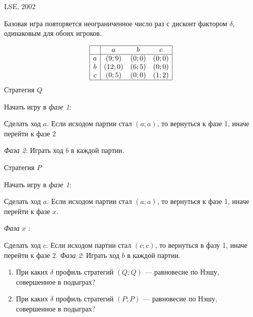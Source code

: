 \begin{problem}
\begin{source}
LSE, 2002
\end{source}
Базовая игра повторяется неограниченное число раз с дисконт фактором  $\delta $, одинаковым для обоих игроков.

\[\begin{array}{|c|ccc|}  \hline {} & {a} & {b} & {c} \\  \hline {a} & {\left(9;9\right)} & {\left(0;0\right)} & {\left(0;0\right)} \\ {b} & {\left(12;0\right)} & {\left(6;5\right)} & {\left(0;0\right)} \\ {c} & {\left(0;5\right)} & {\left(0;0\right)} & {\left(1;2\right)} \\  \hline  \end{array}\]
Стратегия  $Q$\par
Начать игру в {\it фазе 1}:\par
Сделать ход  $a$. Если исходом партии стал  $\left(a;a\right)$, то вернуться к фазе 1, иначе перейти к фазе 2\par
{\it Фаза 2}: Играть ход  $b$  в каждой партии.\par

Стратегия  $P$\par
Начать игру в {\it фазе 1}:\par
Сделать ход  $a$. Если исходом партии стал  $\left(a;a\right)$, то вернуться к фазе 1, иначе перейти к фазе  $x$.\par
{\it Фаза } $x$ :\par
Сделать ход  $c$. Если исходом партии стал  $\left(c;c\right)$, то вернуться в фазу 1, иначе перейти к фазе 2.
{\it Фаза 2}: Играть ход  $b$  в каждой партии.\par
\begin{enumerate}
\item При каких  $\delta $  профиль стратегий  $\left(Q;Q\right)$  --- равновесие по Нэшу, совершенное в подыграх?\par
\item При каких  $\delta $  профиль стратегий  $\left(P;P\right)$  --- равновесие по Нэшу, совершенное в подыграх?
\end{enumerate}


\begin{sol}

\end{sol}
\end{problem}



